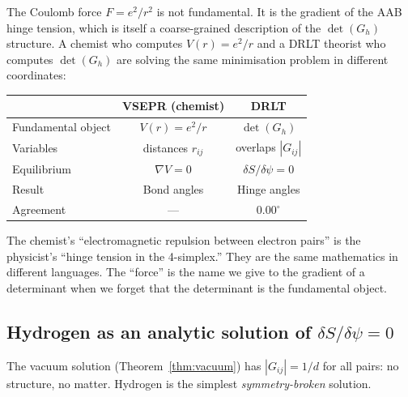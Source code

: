 \begin{remark}
The Coulomb force $F = e^2/r^2$ is not fundamental.  It is the gradient of the AAB hinge tension, which is itself a coarse-grained description of the $\det(G_h)$ structure.  A chemist who computes $V(r) = e^2/r$ and a DRLT theorist who computes $\det(G_h)$ are solving the same minimisation problem in different coordinates:
\begin{center}
\begin{tabular}{lcc}
\hline
& VSEPR (chemist) & DRLT \\
\hline
Fundamental object & $V(r) = e^2/r$ & $\det(G_h)$ \\
Variables & distances $r_{ij}$ & overlaps $|G_{ij}|$ \\
Equilibrium & $\nabla V = 0$ & $\delta S / \delta\psi = 0$ \\
Result & Bond angles & Hinge angles \\
Agreement & --- & $0.00^\circ$ \\
\hline
\end{tabular}
\end{center}
The chemist's ``electromagnetic repulsion between electron pairs'' is the physicist's ``hinge tension in the 4-simplex.''  They are the same mathematics in different languages.  The ``force'' is the name we give to the gradient of a determinant when we forget that the determinant is the fundamental object.
\end{remark}

\subsection{Hydrogen as an analytic solution of $\delta S/\delta\psi = 0$}
\label{sec:hydrogen_analytic}

The vacuum solution (Theorem~\ref{thm:vacuum}) has $|G_{ij}| = 1/d$ for all pairs: no structure, no matter.  Hydrogen is the simplest \emph{symmetry-broken} solution.

